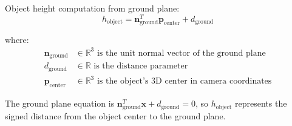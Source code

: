 \documentclass{article}
\begin{document}
Object height computation from ground plane:
$$
h_{\text{object}} = \boldsymbol{n}_{\text{ground}}^T \boldsymbol{p}_{\text{center}} + d_{\text{ground}}
$$

where:
\begin{align}
\boldsymbol{n}_{\text{ground}} &\in \mathbb{R}^3 \text{ is the unit normal vector of the ground plane} \\
d_{\text{ground}} &\in \mathbb{R} \text{ is the distance parameter} \\
\boldsymbol{p}_{\text{center}} &\in \mathbb{R}^3 \text{ is the object's 3D center in camera coordinates}
\end{align}

The ground plane equation is $\boldsymbol{n}_{\text{ground}}^T \boldsymbol{x} + d_{\text{ground}} = 0$, so $h_{\text{object}}$ represents the signed distance from the object center to the ground plane.
\end{document}
